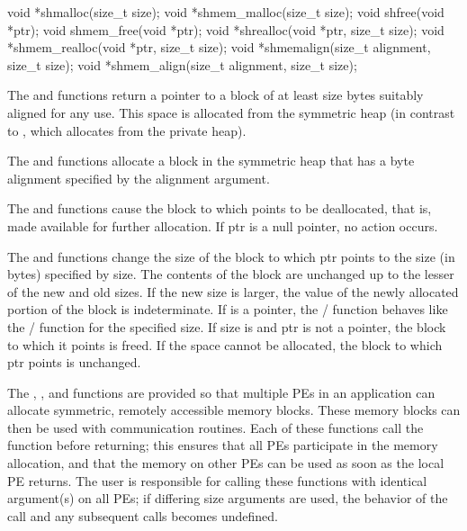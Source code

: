 \synC
void *shmalloc(size_t size);
void *shmem_malloc(size_t size);
void shfree(void *ptr);
void shmem_free(void *ptr);
void *shrealloc(void *ptr, size_t size);
void *shmem_realloc(void *ptr, size_t size);
void *shmemalign(size_t alignment, size_t size);
void *shmem_align(size_t alignment, size_t size);%

{
       The  and   functions return a pointer to a block of at least size
       bytes suitably aligned for any use.  This space is allocated from the
       symmetric heap (in contrast to , which allocates from the
       private heap).

       The   and  functions allocate a block in the symmetric heap that
       has a byte alignment specified by the alignment argument.

       The  and  functions cause the block to which  points to be
       deallocated, that is, made available for further allocation.  If ptr is
       a null pointer, no action occurs. 
              
       The   and   functions change the size of the block to which ptr
       points to the size (in bytes) specified by size.  The contents of the
       block are unchanged up to the lesser of the new and old sizes. If the
       new size is larger, the value of the newly allocated portion of the
       block is indeterminate.  
       If  is a  pointer, the / function behaves like the / function for the specified size.  If size  is  and ptr is not a  pointer, the block to which it points is freed. If the space cannot be allocated, the block to which ptr points is unchanged.

       The , , and  functions are provided  so that multiple \ac{PE}s in an application can allocate symmetric, remotely
       accessible memory blocks.  These memory blocks can then be used with
       \openshmem communication routines.  Each of these functions call the
        function before returning; this ensures that all
       \ac{PE}s participate in the memory allocation, and that the memory on other
       \ac{PE}s can be used	as  soon as the local \ac{PE} returns.  The user is
       responsible for calling these functions with identical argument(s) on
       all \ac{PE}s; if differing size arguments are used, the behavior of the call and any subsequent \openshmem calls becomes undefined.
}

